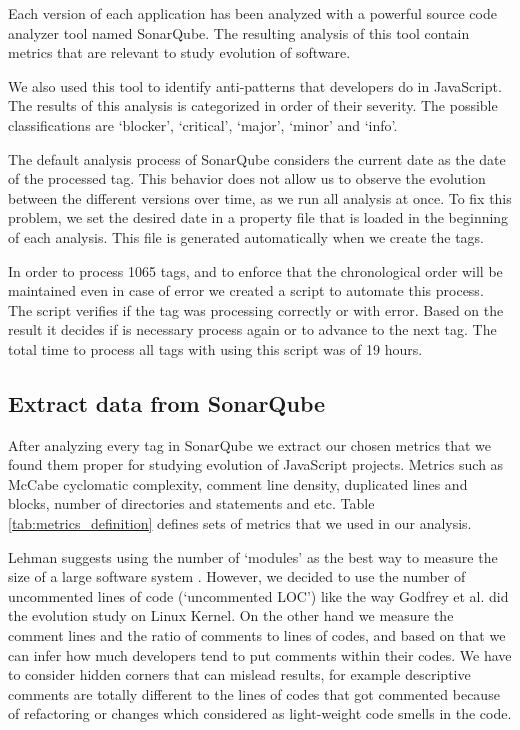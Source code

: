\par
Each version of each application has been analyzed with a powerful source code analyzer tool named SonarQube. The resulting analysis of this tool contain metrics that are relevant to study evolution of software. 
\par
We also used this tool to identify anti-patterns that developers do in JavaScript. The results of this analysis is categorized in order of their severity. The possible classifications are `blocker', `critical', `major', `minor' and `info'.
\par
The default analysis process of SonarQube considers the current date as the date of the processed tag. This behavior does not allow us to observe the evolution between the different versions over time, as we run all analysis at once. To fix this problem, we set the desired date in a property file that is loaded in the beginning of each analysis. This file is generated automatically when we create the tags. 

In order to process 1065 tags, and to enforce that the chronological order will be maintained even in case of error we created a script to automate this process.
The script verifies if the tag was processing correctly or with error. Based on the result it decides if is necessary process again or to advance to the next tag. The total time to  process all tags with using this script was of 19 hours.

\subsection{Extract data from SonarQube}
\par After analyzing every tag in SonarQube we extract our chosen metrics that we found them proper for studying evolution of JavaScript projects. Metrics such as McCabe cyclomatic complexity,  comment line density, duplicated lines and blocks, number of directories and statements and etc. Table  \ref{tab:metrics_definition} defines sets of metrics that we used in our analysis.

\par
Lehman suggests using the number of `modules' as the best way to measure the size of a large software system \cite{Lehman1997METRICS}. However, we decided to use the number of uncommented lines of code (`uncommented LOC') like the way Godfrey et al. \cite{Godfrey2000ICMS} did the evolution study on Linux Kernel. On the other hand we measure the comment lines and the ratio of comments to lines of codes, and based on that we can infer how much developers tend to put comments within their codes. We have to consider hidden corners that can mislead results, for example descriptive comments are totally different to the lines of codes that got commented because of refactoring or changes which considered as light-weight code smells in the code.

